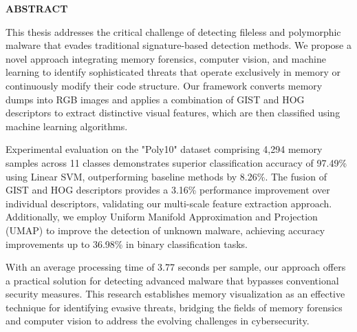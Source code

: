\begin{center}
	\Huge\uppercase{\textbf{Abstract}}
\end{center}

{
\setlength{\baselineskip}{25pt}

This thesis addresses the critical challenge of detecting fileless and polymorphic malware that evades traditional signature-based detection methods. We propose a novel approach integrating memory forensics, computer vision, and machine learning to identify sophisticated threats that operate exclusively in memory or continuously modify their code structure. Our framework converts memory dumps into RGB images and applies a combination of GIST and HOG descriptors to extract distinctive visual features, which are then classified using machine learning algorithms.

Experimental evaluation on the "Poly10" dataset comprising 4,294 memory samples across 11 classes demonstrates superior classification accuracy of 97.49\% using Linear SVM, outperforming baseline methods by 8.26\%. The fusion of GIST and HOG descriptors provides a 3.16\% performance improvement over individual descriptors, validating our multi-scale feature extraction approach. Additionally, we employ Uniform Manifold Approximation and Projection (UMAP) to improve the detection of unknown malware, achieving accuracy improvements up to 36.98\% in binary classification tasks.

With an average processing time of 3.77 seconds per sample, our approach offers a practical solution for detecting advanced malware that bypasses conventional security measures. This research establishes memory visualization as an effective technique for identifying evasive threats, bridging the fields of memory forensics and computer vision to address the evolving challenges in cybersecurity.
}
\clearpage
